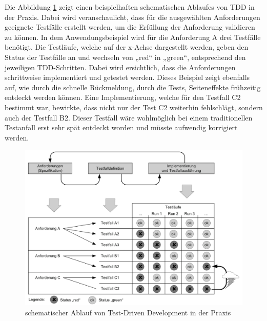 Die Abbildung \ref{Anwendungsbeispiel TDD} zeigt einen beispielhaften schematischen Ablaufes von TDD in der Praxis. Dabei wird veranschaulicht, dass für die ausgewählten Anforderungen geeignete Testfälle erstellt werden, um die Erfüllung der Anforderung validieren zu können. In dem Anwendungsbeispiel wird für die Anforderung A drei Testfälle benötigt. Die Testläufe, welche auf der x-Achse dargestellt werden, geben den Status der Testfälle an und wechseln von „red“ in „green“, entsprechend den jeweiligen TDD-Schritten. Dabei wird ersichtlich, dass die Anforderungen schrittweise implementiert und getestet werden. Dieses Beispiel zeigt ebenfalls auf, wie durch die schnelle Rückmeldung, durch die Tests, Seiteneffekte frühzeitig entdeckt werden können. Eine Implementierung, welche für den Testfall C2 bestimmt war, bewirkte, dass nicht nur der Test C2 weiterhin fehlschlägt, sondern auch der Testfall B2. Dieser Testfall wäre wohlmöglich bei einem traditionellen Testanfall erst sehr spät entdeckt worden und müsste aufwendig korrigiert werden. \cite[S. 154]{schatten_best_2010}

\begin{figure}[h]
	\centering
	\includegraphics[clip,width=1\linewidth]{images/Anwendungsbeispiel TDD.png}
	\caption[schematischer Ablauf von Test-Driven Development in der Praxis ]{schematischer Ablauf von Test-Driven Development in der Praxis \cite[S. 154]{schatten_best_2010}}
	\label{Anwendungsbeispiel TDD}
\end{figure}


